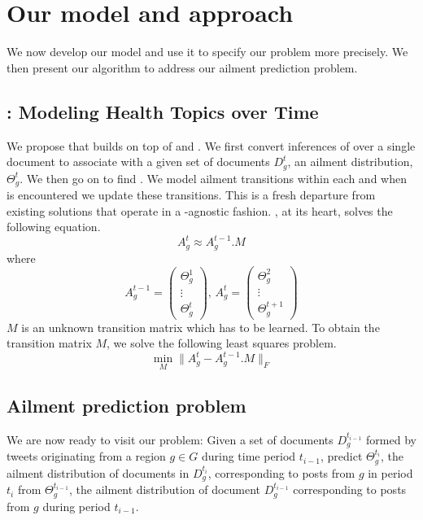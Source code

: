 \section{Our model and approach}
\label{sec:approach}
We now develop our model and use it to specify our problem more
precisely. We then present our algorithm to address our ailment
prediction problem.
\subsection{\tmatam: Modeling Health Topics over Time}
\label{subsec:model}
We propose \tmatam that builds on top of \atam and \tmlda.
We first convert inferences of \atam over a single document to associate with a given set of documents $D_g^t$, an ailment
distribution, $\Theta_g^t$. We then go on to find \seasons. We model ailment transitions within each \season and when \change is 
encountered we update these transitions.  This is a fresh departure
from existing solutions that operate in a \season-agnostic fashion\cite{DBLP:conf/kdd/WangAB12}.
\tmatam, at its heart, solves the following equation.
\begin{equation}
A_g^{t}\approx A_g^{t-1}.M
\end{equation}
where
\begin{equation}
A_g^{t-1}=\begin{pmatrix}\Theta_g^1\\\vdots\\\Theta_g^t\end{pmatrix},\,A_g^t=\begin{pmatrix}\Theta_g^2\\\vdots\\\Theta_g^{t+1}\end{pmatrix}%
\end{equation}
$M$ is an unknown transition matrix which has to be learned.
To obtain the transition matrix $M$, we solve the following least squares problem.
\[
\min_M\|A_g^t- A_g^{t-1}.M\|_F
\]
\subsection{Ailment prediction problem}
\label{subsec:problem}
We are now ready to visit our problem: Given a set of
documents $D_g^{t_{i-1}}$ formed by tweets originating from a region
$g \in G$ during time period $t_{i-1}$, predict $\Theta_g^{t_i}$, the
ailment distribution of documents in $D_g^{t_i}$, corresponding to
posts from $g$ in period $t_i$ from $\Theta_g^{t_{i-1}}$, the ailment
distribution of document $D_g^{t_{i-1}}$ corresponding to posts from
$g$ during period $t_{i-1}$.
